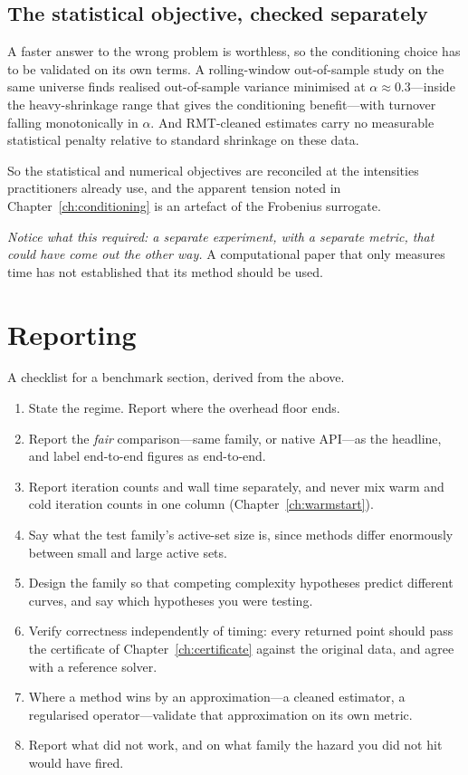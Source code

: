\subsection{The statistical objective, checked separately}

A faster answer to the wrong problem is worthless, so the conditioning choice has to be
validated on its own terms. A rolling-window out-of-sample study on the same universe
finds realised out-of-sample variance minimised at $\alpha \approx 0.3$---inside the
heavy-shrinkage range that gives the conditioning benefit---with turnover falling
monotonically in $\alpha$. And RMT-cleaned estimates carry no measurable statistical
penalty relative to standard shrinkage on these data.

So the statistical and numerical objectives are reconciled at the intensities
practitioners already use, and the apparent tension noted in
Chapter~\ref{ch:conditioning} is an artefact of the Frobenius surrogate.

\emph{Notice what this required: a separate experiment, with a separate metric, that
could have come out the other way.} A computational paper that only measures time has
not established that its method should be used.

\section{Reporting}

A checklist for a benchmark section, derived from the above.

\begin{enumerate}
\item State the regime. Report where the overhead floor ends.
\item Report the \emph{fair} comparison---same family, or native API---as the headline,
      and label end-to-end figures as end-to-end.
\item Report iteration counts and wall time separately, and never mix warm and cold
      iteration counts in one column (Chapter~\ref{ch:warmstart}).
\item Say what the test family's active-set size is, since methods differ enormously
      between small and large active sets.
\item Design the family so that competing complexity hypotheses predict different
      curves, and say which hypotheses you were testing.
\item Verify correctness independently of timing: every returned point should pass the
      certificate of Chapter~\ref{ch:certificate} against the original data, and agree
      with a reference solver.
\item Where a method wins by an approximation---a cleaned estimator, a regularised
      operator---validate that approximation on its own metric.
\item Report what did not work, and on what family the hazard you did not hit would have
      fired.
\end{enumerate}


